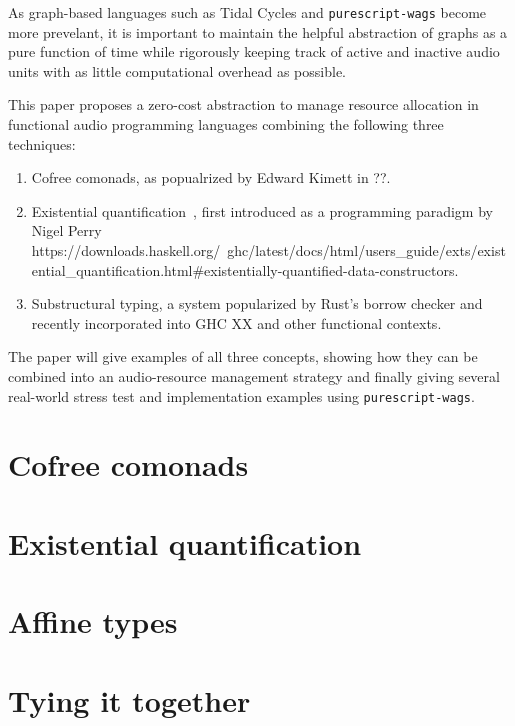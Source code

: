 \documentclass{article}
\begin{document}
As graph-based languages such as Tidal Cycles and \verb=purescript-wags= become more prevelant, it is important to maintain the helpful abstraction of graphs as a pure function of time while rigorously keeping track of active and inactive audio units with as little computational overhead as possible.

This paper proposes a zero-cost abstraction to manage resource allocation in functional audio programming languages combining the following three techniques:

\begin{enumerate}
  \item Cofree comonads, as popualrized by Edward Kimett in ??.
  \item Existential quantification~\cite{Someone:00, Someone:09}, first introduced as a programming paradigm by Nigel Perry https://downloads.haskell.org/~ghc/latest/docs/html/users_guide/exts/existential_quantification.html#existentially-quantified-data-constructors.
  \item Substructural typing, a system popularized by Rust's borrow checker and recently incorporated into GHC XX and other functional contexts.
\end{enumerate}

The paper will give examples of all three concepts, showing how they can be combined into an audio-resource management strategy and finally giving several real-world stress test and implementation examples using \verb=purescript-wags=.

\section{Cofree comonads}
\label{sec:cofree_comonads}

\section{Existential quantification}
\label{sec:existential_quantification}

\section{Affine types}
\label{sec:affine_types}

\section{Tying it together}
\label{sec:tying_it_together}
\end{document}
